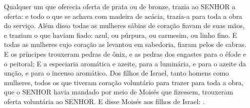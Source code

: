 {  Qualquer um que oferecia oferta de prata ou de bronze, trazia ao SENHOR a oferta: e todo o que se achava com madeira de acácia, trazia-a para toda a obra do serviço.
  Além disso todas as mulheres sábias de coração fiavam de suas mãos, e traziam o que haviam fiado: azul, ou púrpura, ou carmesim, ou linho fino.
  E todas as mulheres cujo coração as levantou em sabedoria, fiaram pelos de cabras.
  E os príncipes trouxeram pedras de ônix, e as pedras dos engastes para o éfode e o peitoral;
  E a especiaria aromática e azeite, para a luminária, e para o azeite da unção, e para o incenso aromático.
  Dos filhos de Israel, tanto homens como mulheres, todos os que tiveram coração voluntário para trazer para toda a obra, que o SENHOR havia mandado por meio de Moisés que fizessem, trouxeram oferta voluntária ao SENHOR.
  E disse Moisés aos filhos de Israel: .
\par }

